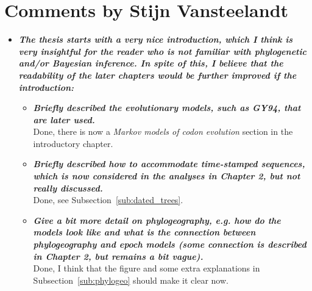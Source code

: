 \documentclass[english]{article}
\begin{document}

\section*{Comments by Stijn Vansteelandt}

\begin{itemize}

\item {
{\it
\textbf{
The thesis starts with a very nice introduction, which I think is very insightful for the reader who is not familiar with phylogenetic and/or Bayesian inference. 
In spite of this, I believe that the readability of the later chapters would be further improved if the introduction:
}%
}%
}%

\begin{itemize}

\item {
{\it
\textbf{
Briefly described the evolutionary models, such as GY94, that are later used.
}%
}%
}%
\\
Done, there is now a \emph{Markov models of codon evolution} section in the introductory chapter.


\item {
{\it
\textbf{
Briefly described how to accommodate time-stamped sequences, which is now considered in the analyses in Chapter 2, but not really discussed.
}%
}%
}%
\\
Done, see Subsection~\ref{sub:dated_trees}.




\item {
{\it
\textbf{
Give a bit more detail on phylogeography, e.g. how do the models look like and what is the connection between phylogeography and epoch models (some connection is described in Chapter 2, but remains a bit vague).
}%
}%
}%
\\
Done, I think that the figure and some extra explanations in Subsection~\ref{sub:phylogeo} should make it clear now.


\end{itemize}


\end{itemize}
\end{document}
